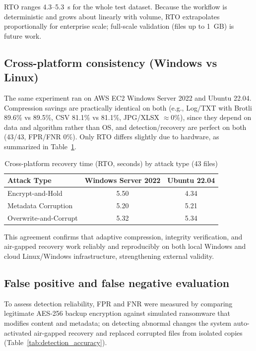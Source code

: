 \documentclass{iaesarticle}
\begin{document}
RTO ranges 4.3--5.3~s for the whole test dataset. Because the workflow is deterministic and grows about linearly with volume, RTO extrapolates proportionally for enterprise scale; full-scale validation (files up to 1~GB) is future work.

\subsection{Cross-platform consistency (Windows vs Linux)}
The same experiment ran on AWS EC2 Windows Server 2022 and Ubuntu 22.04. Compression savings are practically identical on both (e.g., Log/TXT with Brotli 89.6\% vs 89.5\%, CSV 81.1\% vs 81.1\%, JPG/XLSX $\approx$0\%), since they depend on data and algorithm rather than OS, and detection/recovery are perfect on both (43/43, FPR/FNR 0\%). Only RTO differs slightly due to hardware, as summarized in Table~\ref{tab:cross_platform}.

\begin{table}[htbp]
\centering
\fontsize{8pt}{10pt}\selectfont
\caption{Cross-platform recovery time (RTO, seconds) by attack type (43 files)}
\label{tab:cross_platform}
\begin{tabular}{l c c}
\hline
\textbf{Attack Type} & \textbf{Windows Server 2022} & \textbf{Ubuntu 22.04} \\
\hline
Encrypt-and-Hold        & 5.50 & 4.34 \\
Metadata Corruption     & 5.20 & 5.21 \\
Overwrite-and-Corrupt   & 5.32 & 5.34 \\
\hline
\end{tabular}
\end{table}

This agreement confirms that adaptive compression, integrity verification, and air-gapped recovery work reliably and reproducibly on both local Windows and cloud Linux/Windows infrastructure, strengthening external validity.

\subsection{False positive and false negative evaluation}
To assess detection reliability, FPR and FNR were measured by comparing legitimate AES-256 backup encryption against simulated ransomware that modifies content and metadata; on detecting abnormal changes the system auto-activated air-gapped recovery and replaced corrupted files from isolated copies (Table~\ref{tab:detection_accuracy}).
\end{document}

